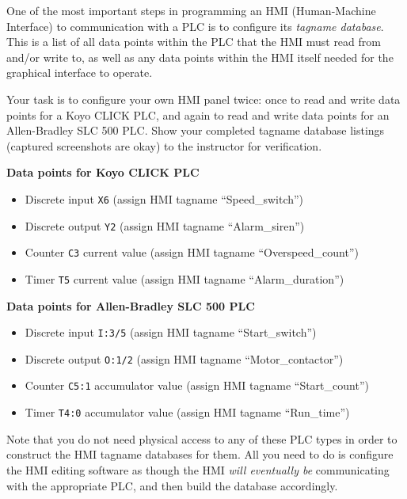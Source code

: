 

One of the most important steps in programming an HMI (Human-Machine Interface) to communication with a PLC is to configure its {\it tagname database}.  This is a list of all data points within the PLC that the HMI must read from and/or write to, as well as any data points within the HMI itself needed for the graphical interface to operate.

Your task is to configure your own HMI panel twice: once to read and write data points for a Koyo CLICK PLC, and again to read and write data points for an Allen-Bradley SLC 500 PLC.  Show your completed tagname database listings (captured screenshots are okay) to the instructor for verification.

\vskip 10pt

{\bf Data points for Koyo CLICK PLC}
\begin{itemize}
\item{} Discrete input {\tt X6} (assign HMI tagname ``Speed\_switch'')
\item{} Discrete output {\tt Y2} (assign HMI tagname ``Alarm\_siren'')
\item{} Counter {\tt C3} current value (assign HMI tagname ``Overspeed\_count'')
\item{} Timer {\tt T5} current value (assign HMI tagname ``Alarm\_duration'')
\end{itemize}

\vskip 10pt

{\bf Data points for Allen-Bradley SLC 500 PLC}
\begin{itemize}
\item{} Discrete input {\tt I:3/5} (assign HMI tagname ``Start\_switch'')
\item{} Discrete output {\tt O:1/2} (assign HMI tagname ``Motor\_contactor'')
\item{} Counter {\tt C5:1} accumulator value (assign HMI tagname ``Start\_count'')
\item{} Timer {\tt T4:0} accumulator value (assign HMI tagname ``Run\_time'')
\end{itemize}

\vskip 10pt

Note that you do not need physical access to any of these PLC types in order to construct the HMI tagname databases for them.  All you need to do is configure the HMI editing software as though the HMI {\it will eventually be} communicating with the appropriate PLC, and then build the database accordingly.


